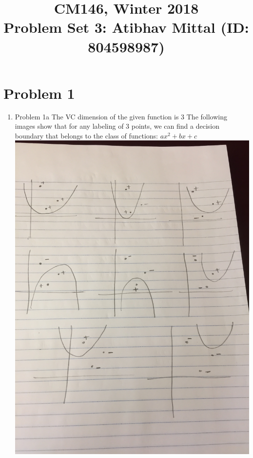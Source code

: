 \documentclass[11pt]{article}
\newcommand{\cnum}{CM146}
\newcommand{\ced}{Winter 2018}
\newcommand{\ctitle}[3]{\title{\vspace{-0.5in}\cnum, \ced\\Problem Set #1: #2}}
\newcommand{\solution}[1]{{{\color{blue}{\bf Solution:} {#1}}}}
\begin{document}
\ctitle{3}{Atibhav Mittal (ID: 804598987)}
\author{}
\date{}
\maketitle
\vspace{-0.75in}

\section{Problem 1}
\begin{enumerate}
\item Problem 1a
\solution{} \newline
The VC dimension of the given function is 3
The following images show that for any labeling of 3 points, we can find a 
decision boundary that belongs to the class of functions: $ax^2 + bx + c$ \newline
\includegraphics[scale=0.1]{prob_1.JPG} \newline

\end{enumerate}
\end{document}
